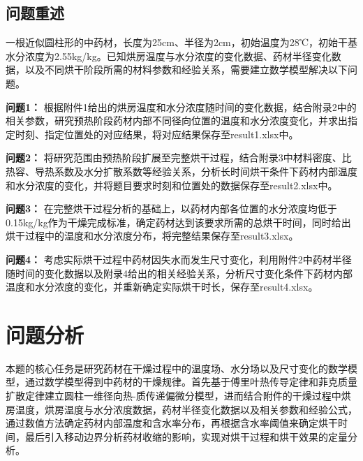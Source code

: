 \documentclass[withoutpreface,bwprint]{cumcmthesis}
\begin{document}
\subsection{问题重述}
一根近似圆柱形的中药材，长度为25cm、半径为2cm，初始温度为28℃，初始干基水分浓度为2.55kg/kg。已知烘房温度与水分浓度的变化数据、药材半径变化数据，以及不同烘干阶段所需的材料参数和经验关系，需要建立数学模型解决以下问题。

\textbf{问题1：}  
根据附件1给出的烘房温度和水分浓度随时间的变化数据，结合附录2中的相关参数，研究预热阶段药材内部不同径向位置的温度和水分浓度变化，并求出指定时刻、指定位置处的对应结果，将对应结果保存至result1.xlsx中。

\textbf{问题2：}  
将研究范围由预热阶段扩展至完整烘干过程，结合附录3中材料密度、比热容、导热系数及水分扩散系数等经验关系，分析长时间烘干条件下药材内部温度和水分浓度的变化，并将题目要求时刻和位置处的数据保存至result2.xlsx中。

\textbf{问题3：} 
在完整烘干过程分析的基础上，以药材内部各位置的水分浓度均低于0.15kg/kg作为干燥完成标准，确定药材达到该要求所需的总烘干时间，同时给出烘干过程中的温度和水分浓度分布，将完整结果保存至result3.xlsx。

\textbf{问题4：}  
考虑实际烘干过程中药材因失水而发生尺寸变化，利用附件2中药材半径随时间的变化数据以及附录4给出的相关经验关系，分析尺寸变化条件下药材内部温度和水分浓度的变化，并重新确定实际烘干时长，保存至result4.xlsx。
















 




















\section{问题分析}
本题的核心任务是研究药材在干燥过程中的温度场、水分场以及尺寸变化的数学模型，通过数学模型得到中药材的干燥规律。首先基于傅里叶热传导定律和菲克质量扩散定律建立圆柱一维径向热-质传递偏微分模型，进而结合附件的干燥过程中烘房温度，烘房温度与水分浓度数据，药材半径变化数据以及相关参数和经验公式，通过数值方法确定药材内部温度和含水率分布，再根据含水率阈值来确定烘干时间，最后引入移动边界分析药材收缩的影响，实现对烘干过程和烘干效果的定量分析。
\end{document}
